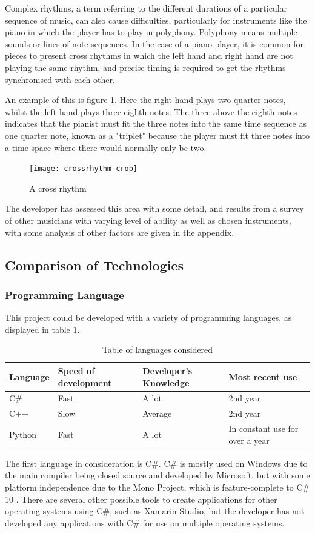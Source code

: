 Complex rhythms, a term referring to the different durations of a particular sequence of music, can also cause difficulties, particularly for instruments like the piano in which the player has to play in polyphony. Polyphony means multiple sounds or lines of note sequences. In the case of a piano player, it is common for pieces to present cross rhythms in which the left hand and right hand are not playing the same rhythm, and precise timing is required to get the rhythms synchronised with each other. 

An example of this is figure \ref{fig:crossrhythms}. Here the right hand plays two quarter notes, whilst the left hand plays three eighth notes. The three above the eighth notes indicates that the pianist must fit the three notes into the same time sequence as one quarter note, known as a "triplet" because the player must fit three notes into a time space where there would normally only be two.

\begin{figure}[H]
\centering
\texttt{[image: crossrhythm-crop]}
\caption{A cross rhythm}
\label{fig:crossrhythms}	
\end{figure}

The developer has assessed this area with some detail, and results from a survey of other musicians with varying level of ability as well as chosen instruments, with some analysis of other factors are given in the appendix.

\subsection{Comparison of Technologies}
\subsubsection{Programming Language}
This project could be developed with a variety of programming languages, as displayed in table \ref{table:langs}.

\begin{table}[H]
\centering
\begin{tabular}{| l | l | l | l |} \hline
  {Language} & {Speed of development} & {Developer's Knowledge} & {Most recent use} \\ \hline
  C\# & Fast & A lot & 2nd year \\ \hline
  C++ & Slow & Average & 2nd year \\ \hline
  Python & Fast & A lot & In constant use for over a year \\ \hline
  
\end{tabular}
\caption{Table of languages considered}
\label{table:langs}
\end{table}
The first language in consideration is C\#. C\# is mostly used on Windows due to the main compiler being closed source and developed by Microsoft, but with some platform independence due to the Mono Project, which is feature-complete to C\# 10 \parencite{MonoDev}. There are several other possible tools to create applications for other operating systems using C\#, such as Xamarin Studio, but the developer has not developed any applications with C\# for use on multiple operating systems. 

